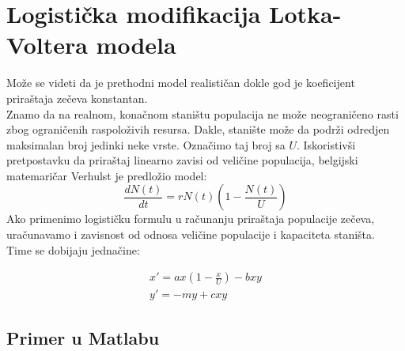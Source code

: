 \documentclass[a4paper]{article}
\begin{document}
\section{Logistička modifikacija Lotka-Voltera modela}
\label{sec:log_mod}
Može se videti da je prethodni model realističan dokle god je koeficijent priraštaja zečeva konstantan.\\
Znamo da na realnom, konačnom staništu populacija ne može neograničeno rasti zbog
ograničenih raspoloživih resursa. Dakle, stanište može da podrži odredjen maksimalan broj
jedinki neke vrste. Označimo taj broj sa $U$. Iskoristivši pretpostavku
da priraštaj linearno zavisi od veličine populacija, belgijski matemaričar Verhulst je predložio model:
	\begin{equation}
		\frac{dN(t)}{dt}=rN (t) (1 - \frac{N (t)}{U})
	\end{equation}
Ako primenimo logističku formulu u računanju priraštaja populacije zečeva, uračunavamo i zavisnost
od odnosa veličine populacije i kapaciteta staništa.\\
Time se dobijaju jednačine:

    \begin{equation}
        \begin{aligned}
            x' = ax(1 - \frac{x}{U}) - bxy\\
            y' = -my + cxy
        \end{aligned}
	\end{equation}

\subsection{Primer u Matlabu}
\label{sub:log_mod_matlab}


\end{document}
